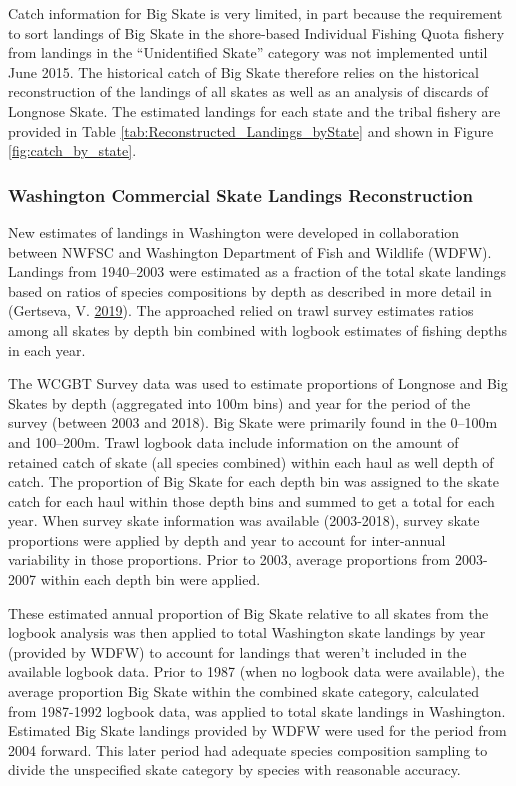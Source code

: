 \documentclass[12pt,]{article}
\begin{document}
Catch information for Big Skate is very limited, in part because the
requirement to sort landings of Big Skate in the shore-based Individual
Fishing Quota fishery from landings in the ``Unidentified Skate''
category was not implemented until June 2015. The historical catch of
Big Skate therefore relies on the historical reconstruction of the
landings of all skates as well as an analysis of discards of Longnose
Skate. The estimated landings for each state and the tribal fishery are
provided in Table \ref{tab:Reconstructed_Landings_byState} and shown in
Figure \ref{fig:catch_by_state}.

\hypertarget{washington-commercial-skate-landings-reconstruction}{%
\subsubsection{Washington Commercial Skate Landings
Reconstruction}\label{washington-commercial-skate-landings-reconstruction}}

New estimates of landings in Washington were developed in collaboration
between NWFSC and Washington Department of Fish and Wildlife (WDFW).
Landings from 1940--2003 were estimated as a fraction of the total skate
landings based on ratios of species compositions by depth as described
in more detail in (Gertseva, V.
\protect\hyperlink{ref-Gertseva2019}{2019}). The approached relied on
trawl survey estimates ratios among all skates by depth bin combined
with logbook estimates of fishing depths in each year.

The WCGBT Survey data was used to estimate proportions of Longnose and
Big Skates by depth (aggregated into 100m bins) and year for the period
of the survey (between 2003 and 2018). Big Skate were primarily found in
the 0--100m and 100--200m. Trawl logbook data include information on the
amount of retained catch of skate (all species combined) within each
haul as well depth of catch. The proportion of Big Skate for each depth
bin was assigned to the skate catch for each haul within those depth
bins and summed to get a total for each year. When survey skate
information was available (2003-2018), survey skate proportions were
applied by depth and year to account for inter-annual variability in
those proportions. Prior to 2003, average proportions from 2003-2007
within each depth bin were applied.

These estimated annual proportion of Big Skate relative to all skates
from the logbook analysis was then applied to total Washington skate
landings by year (provided by WDFW) to account for landings that weren't
included in the available logbook data. Prior to 1987 (when no logbook
data were available), the average proportion Big Skate within the
combined skate category, calculated from 1987-1992 logbook data, was
applied to total skate landings in Washington. Estimated Big Skate
landings provided by WDFW were used for the period from 2004 forward.
This later period had adequate species composition sampling to divide
the unspecified skate category by species with reasonable accuracy.
\end{document}
